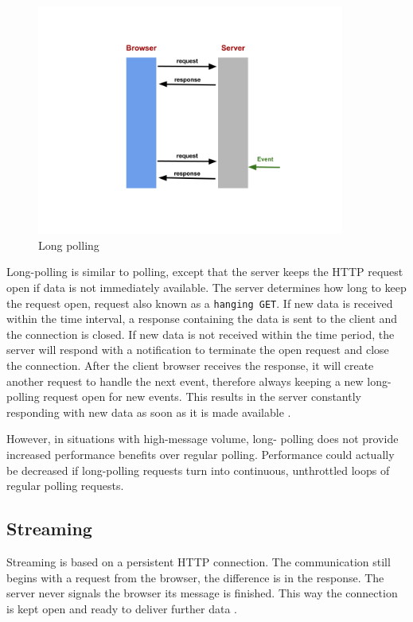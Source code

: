 \begin{figure}[H]
\centering
\includegraphics[width=0.9\textwidth]{./Figures/long_polling.png}
\caption[Long polling]{Long polling}
\label{fig:long_polling}
\end{figure}

Long-polling is similar to polling, except that the server keeps the HTTP
request open if data is not immediately available. The server determines how
long to keep the request open, request also known as a \texttt{hanging GET}. If
new data is received within the time interval, a response containing the data
is sent to the client and the connection is closed. If new data is not received
within the time period, the server will respond with a notification to
terminate the open request and close the connection. After the client browser
receives the response, it will create another  request to handle the next
event, therefore always keeping a new long-polling request open for new events.
This results in the server constantly responding with new data as soon as it is
made available \citep{Reference2}.

However, in situations with high-message volume, long- polling does not provide
increased performance benefits over regular polling. Performance could actually
be decreased if long-polling requests turn into continuous, unthrottled loops
of regular polling requests.


\subsection{Streaming}

Streaming is based on a persistent HTTP connection. The communication still
begins with a request from the browser, the difference is in the response. The
server never signals the browser its message is finished. This way the
connection is kept open and ready to deliver further data \citep{Reference2}.

